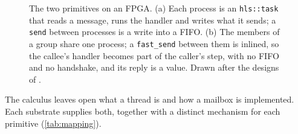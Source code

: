 \documentclass[11pt]{article}
\theoremstyle{definition}
\theoremstyle{remark}
\newcommand{\fs}{\texttt{fast\_send}}
\newcommand{\snd}{\texttt{send}}
\begin{document}
\begin{figure}[t]
\caption{The two primitives on an FPGA. (a) Each process is an \texttt{hls::task} that
reads a message, runs the handler and writes what it sends; a \snd{} between processes is
a write into a FIFO. (b) The members of a group share one process; a \fs{} between them
is inlined, so the callee's handler becomes part of the caller's step, with no FIFO and
no handshake, and its reply is a value. Drawn after the designs of \cite{fpgaactors}.}
\label{fig:fpgamap}
\end{figure}

The calculus leaves open what a thread is and how a mailbox is implemented. Each
substrate supplies both, together with a distinct mechanism for each primitive
(\cref{tab:mapping}).
\end{document}
